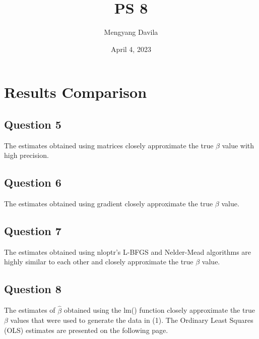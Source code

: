 \documentclass{article}
\title{PS 8}
\author{Mengyang Davila}
\date{April 4, 2023}
\begin{document}
\maketitle
\section*{Results Comparison}
\subsection*{Question 5}
The estimates obtained using matrices closely approximate the true $\beta$ value with high precision.

\subsection*{Question 6}
The estimates obtained using gradient closely approximate the true $\beta$ value.

\subsection*{Question 7}
The estimates obtained using nloptr's L-BFGS and Nelder-Mead algorithms are highly similar to each other and closely approximate the true $\beta$ value.

\subsection*{Question 8}
The estimates of $\hat{\beta}$ obtained using the lm() function closely approximate the true $\beta$ values that were used to generate the data in (1). The Ordinary Least Squares (OLS) estimates are presented on the following page.
\end{document}
